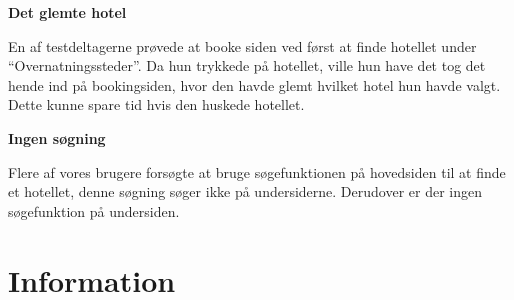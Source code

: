 \documentclass[10pt,a4paper]{article}      %
\newcommand\pic[1]{\texttt{[image: Pics/\#1]}}
\renewcommand\goodidea{\pic{goodidea}}
\renewcommand\seriousproblem{\pic{seriousproblem}}
\begin{document}
\begin{kommentarer}
\item[\goodidea] \textbf{Det glemte hotel}

En af testdeltagerne prøvede at booke siden ved først at finde hotellet under
``Overnatningssteder''. Da hun trykkede på hotellet, ville hun have det tog det hende
ind på bookingsiden, hvor den havde glemt hvilket hotel hun havde valgt. Dette
kunne spare tid hvis den huskede hotellet.

\item[\seriousproblem] \textbf{Ingen søgning}

Flere af vores brugere forsøgte at bruge søgefunktionen på hovedsiden til at
finde et hotellet, denne søgning søger ikke på undersiderne. Derudover er der
ingen søgefunktion på undersiden.

\end{kommentarer}


\section{Information}
\end{document}
